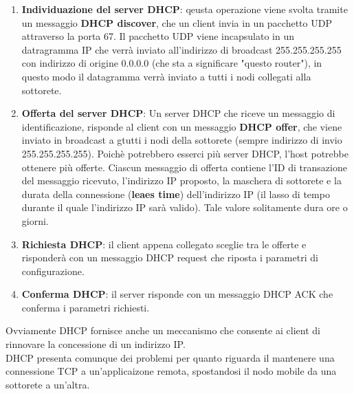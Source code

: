 \documentclass[11pt,a4paper]{article}
\begin{document}
\begin{enumerate}
	\item \textbf{Individuazione del server DHCP}: qeusta operazione viene svolta tramite un messaggio \textbf{DHCP discover}, che un client invia in un pacchetto UDP attraverso la porta 67. Il pacchetto UDP viene incapsulato in un datragramma IP che verrà inviato all'indirizzo di broadcast 255.255.255.255 con indirizzo di origine 0.0.0.0 (che sta a significare "questo router"), in questo modo il datagramma verrà inviato a tutti i nodi collegati alla sottorete.
	\item \textbf{Offerta del server DHCP}: Un server DHCP che riceve un messaggio di identificazione, risponde al client con un messaggio \textbf{DHCP offer}, che viene inviato in broadcast a gtutti i nodi della sottorete (sempre indirizzo di invio 255.255.255.255). Poichè potrebbero esserci più server DHCP, l'host potrebbe ottenere più offerte. Ciascun messaggio di offerta contiene l'ID di transazione del messaggio ricevuto, l'indirizzo IP proposto, la maschera di sottorete e la durata della connessione (\textbf{leaes time}) dell'indirizzo IP (il lasso di tempo durante il quale l'indirizzo IP sarà valido). Tale valore solitamente dura ore o giorni.
	\item \textbf{Richiesta DHCP}: il client appena collegato sceglie tra le offerte e risponderà con un messaggio DHCP request che riposta i parametri di configurazione.
	\item \textbf{Conferma DHCP}: il server risponde con un messaggio DHCP ACK che conferma i parametri richiesti.
\end{enumerate}
Ovviamente DHCP fornisce anche un meccanismo che consente ai client di rinnovare la concessione di un indirizzo IP. \\
DHCP presenta comunque dei problemi per quanto riguarda il mantenere una connessione TCP a un'applicaizone remota, spostandosi il nodo mobile da una sottorete a un'altra.
\end{document}
